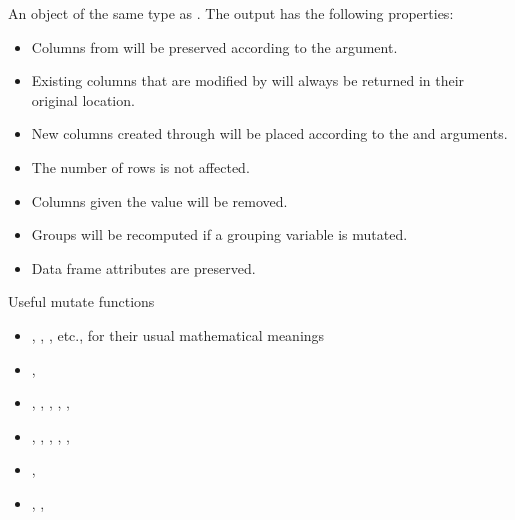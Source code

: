\documentclass[a4paper]{book}
\begin{document}
%
\begin{Value}
An object of the same type as . The output has the following
properties:
\begin{itemize}

\item{} Columns from  will be preserved according to the  argument.
\item{} Existing columns that are modified by  will always be returned in
their original location.
\item{} New columns created through  will be placed according to the
 and  arguments.
\item{} The number of rows is not affected.
\item{} Columns given the value  will be removed.
\item{} Groups will be recomputed if a grouping variable is mutated.
\item{} Data frame attributes are preserved.

\end{itemize}

\end{Value}
%
\begin{Section}{Useful mutate functions}

\begin{itemize}

\item{} \code{\LinkA{+}{+}}, , , etc., for their usual mathematical meanings
\item{} , 
\item{} , , , ,
, 
\item{} , , , , , 
\item{} , 
\item{} , , 

\end{itemize}

\end{Section}
\end{document}
